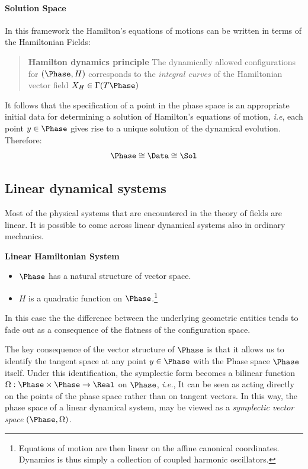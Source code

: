 \documentclass[Main]{subfiles}
\begin{document}
	\paragraph{Solution Space}
	In this framework the Hamilton's equations of motions can be written in terms of the Hamiltonian Fields:
				\begin{quotation}
				\textbf{Hamilton dynamics principle}
				The dynamically allowed configurations for $(\Phase,H)$ corresponds to the \emph{ integral curves}\cite{Abraham1978} of the Hamiltonian vector field $X_H \in \Gamma(T\Phase)$
			\end{quotation}
		It follows that the specification of a point in the phase space is an appropriate initial data for determining a solution of Hamilton's equations of motion, \textit{i.e}, each point $y\in \Phase$  gives rise to a unique solution of the dynamical evolution.
		Therefore:
		\begin{equation}\label{Eq:PhaseDataSol}
			\Phase \cong \Data \cong \Sol
		\end{equation}
	
	\subsection{Linear dynamical systems}\label{Section:LinearClassicalSystem}
	Most of the physical systems that are encountered in the theory of fields are linear.	
	It is possible to come across linear dynamical systems also in ordinary mechanics. 
		\begin{remark}
			\textbf{Linear Hamiltonian System}
			\begin{itemize}
				\item $\Phase$ has a natural structure of vector space.
				\item	$H$ is a quadratic function on $\Phase$.\footnote{Equations of motion are then linear on the affine canonical coordinates. Dynamics is thus simply a collection of coupled harmonic oscillators.}
			\end{itemize}
		\end{remark}

	In this case the the difference between the underlying geometric entities tends to fade out as a consequence of the flatness of the configuration space.
	
	The key consequence of the vector structure of $\Phase$  is that it allows us to identify the tangent space at any point $y \in \Phase$ with the Phase space $\Phase$ itself.
	Under this identification, the symplectic form becomes a bilinear function $\Omega: \Phase \times \Phase \rightarrow \Real$ on $\Phase$, \textit{i.e.}, It can be seen as acting directly on the points of the phase space rather than on tangent vectors.
	In this way, the phase space of a linear dynamical system, may be viewed  as a \emph{symplectic vector space} $(\Phase, \Omega)$.
	
\end{document}
